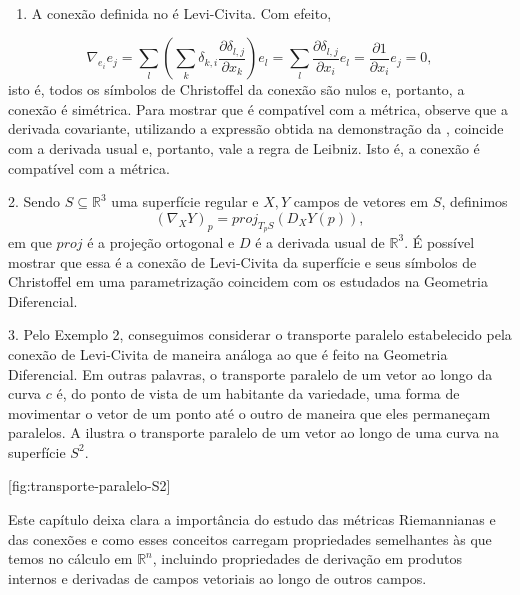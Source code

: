 \begin{examples}
	\label{ex:levi-civita-transporte-paralelo}
	$ $
	\begin{enumerate}
		\item A conexão definida no  é Levi-Civita. Com efeito,
	\end{enumerate}
	\begin{equation*}
		\nabla_{e_{i}}e_{j}=\sum_{l}\left( \sum_{k}\delta_{k,i}\frac{\partial\delta_{l,j}}{\partial x_{k}} \right)e_{l} = \sum_{l}\frac{\partial\delta_{l,j}}{\partial x_{i}}e_{l}=\frac{\partial1}{\partial x_{i}}e_{j}=0,
	\end{equation*}
	isto é, todos os símbolos de Christoffel da conexão são nulos e, portanto, a conexão é simétrica. Para mostrar que é compatível com a métrica, observe que a derivada covariante, utilizando a expressão obtida na demonstração da , coincide com a derivada usual e, portanto, vale a regra de Leibniz. Isto é, a conexão é compatível com a métrica.

	2. Sendo $S \subseteq \mathbb{R}^{3}$ uma superfície regular e $X,Y$ campos de vetores em $S$, definimos
	\begin{equation*}
		(\nabla_{X}Y)_{p}=proj_{T_{p}S}(D_{X}Y(p)),
	\end{equation*}
	em que $proj$ é a projeção ortogonal e $D$ é a derivada usual de $\mathbb{R}^{3}$. É possível mostrar que essa é a conexão de Levi-Civita da superfície e seus símbolos de Christoffel em uma parametrização coincidem com os estudados na Geometria Diferencial.

	3. Pelo Exemplo 2, conseguimos considerar o transporte paralelo estabelecido pela conexão de Levi-Civita de maneira análoga ao que é feito na Geometria Diferencial. Em outras palavras, o transporte paralelo de um vetor ao longo da curva $c$ é, do ponto de vista de um habitante da variedade, uma forma de movimentar o vetor de um ponto até o outro de maneira que eles permaneçam paralelos. A  ilustra o transporte paralelo de um vetor ao longo de uma curva na superfície $S^{2}$.

	[fig:transporte-paralelo-S2]
\end{examples}
Este capítulo deixa clara a importância do estudo das métricas Riemannianas e das conexões e como esses conceitos carregam propriedades semelhantes às que temos no cálculo em $\mathbb{R}^{n}$, incluindo propriedades de derivação em produtos internos e derivadas de campos vetoriais ao longo de outros campos.
